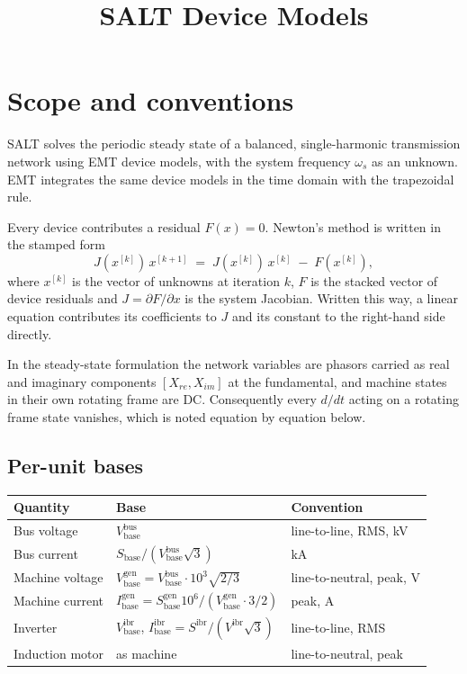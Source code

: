 \documentclass[11pt]{article}
\title{SALT Device Models}
\author{}
\date{}
\newcommand{\wsys}{\omega_s}
\begin{document}
\maketitle

\section{Scope and conventions}

SALT solves the periodic steady state of a balanced, single-harmonic
transmission network using EMT device models, with the system frequency
$\wsys$ as an unknown. EMT integrates the same device models in the time
domain with the trapezoidal rule.

Every device contributes a residual $F(x)=0$. Newton's method is written in
the stamped form
\begin{equation}
  J(x^{[k]})\,x^{[k+1]} \;=\; J(x^{[k]})\,x^{[k]} \;-\; F(x^{[k]}),
  \label{eq:newton}
\end{equation}
where $x^{[k]}$ is the vector of unknowns at iteration $k$, $F$ is the
stacked vector of device residuals and $J=\partial F/\partial x$ is the
system Jacobian. Written this way, a linear equation contributes its
coefficients to $J$ and its constant to the right-hand side directly.

In the steady-state formulation the network variables are phasors carried
as real and imaginary components $[X_{re},X_{im}]$ at the fundamental, and
machine states in their own rotating frame are DC. Consequently every
$d/dt$ acting on a rotating frame state vanishes, which is noted equation
by equation below.

\subsection{Per-unit bases}
\label{sec:bases}

\begin{tabular}{@{}lll@{}}
\toprule
Quantity & Base & Convention \\
\midrule
Bus voltage        & $V_{\text{base}}^{\text{bus}}$ & line-to-line, RMS, kV \\
Bus current        & $S_{\text{base}}/(V_{\text{base}}^{\text{bus}}\sqrt{3})$ & kA \\
Machine voltage    & $V_{\text{base}}^{\text{gen}}=V_{\text{base}}^{\text{bus}}\!\cdot\!10^3\sqrt{2/3}$ & line-to-neutral, peak, V \\
Machine current    & $I_{\text{base}}^{\text{gen}}=S_{\text{base}}^{\text{gen}}10^6/(V_{\text{base}}^{\text{gen}}\cdot 3/2)$ & peak, A \\
Inverter           & $V_{\text{base}}^{\text{ibr}}$, $I_{\text{base}}^{\text{ibr}}=S^{\text{ibr}}/(V^{\text{ibr}}\sqrt{3})$ & line-to-line, RMS \\
Induction motor    & as machine & line-to-neutral, peak \\
\bottomrule
\end{tabular}
\end{document}
